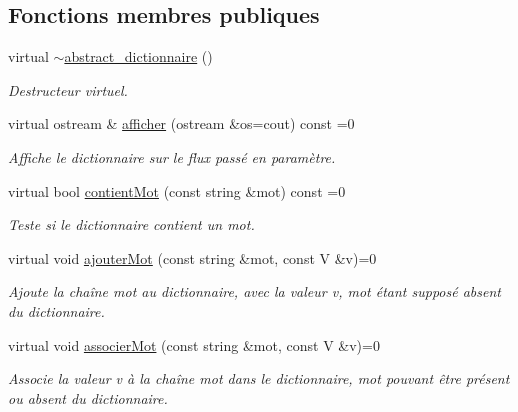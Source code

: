 \subsection*{Fonctions membres publiques}
\begin{DoxyCompactItemize}
\item 
\hypertarget{classabstract__dictionnaire_a222d289fc3bdd6c0e4911509e7fa855d}{virtual \hyperlink{classabstract__dictionnaire_a222d289fc3bdd6c0e4911509e7fa855d}{$\sim$abstract\-\_\-dictionnaire} ()}\label{classabstract__dictionnaire_a222d289fc3bdd6c0e4911509e7fa855d}

\begin{DoxyCompactList}\small\item\em Destructeur virtuel. \end{DoxyCompactList}\item 
virtual ostream \& \hyperlink{classabstract__dictionnaire_ae472681c840b81cfc512b47dc664774c}{afficher} (ostream \&os=cout) const =0
\begin{DoxyCompactList}\small\item\em Affiche le dictionnaire sur le flux passé en paramètre. \end{DoxyCompactList}\item 
virtual bool \hyperlink{classabstract__dictionnaire_abeb4f33d1600bcf2a6058f7bdae65aaf}{contient\-Mot} (const string \&mot) const =0
\begin{DoxyCompactList}\small\item\em Teste si le dictionnaire contient un mot. \end{DoxyCompactList}\item 
virtual void \hyperlink{classabstract__dictionnaire_a0c3af73e050ee04b8a14161052c5e636}{ajouter\-Mot} (const string \&mot, const V \&v)=0
\begin{DoxyCompactList}\small\item\em Ajoute la chaîne mot au dictionnaire, avec la valeur v, mot étant supposé absent du dictionnaire. \end{DoxyCompactList}\item 
virtual void \hyperlink{classabstract__dictionnaire_a3d19bb8707514928a5f54e73701f0d1c}{associer\-Mot} (const string \&mot, const V \&v)=0
\begin{DoxyCompactList}\small\item\em Associe la valeur v à la chaîne mot dans le dictionnaire, mot pouvant être présent ou absent du dictionnaire. \end{DoxyCompactList}\item 

\end{DoxyCompactItemize}
